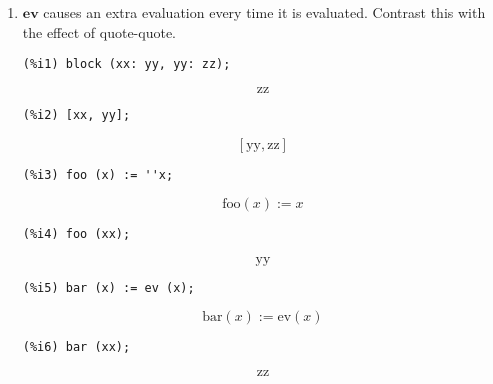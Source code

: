 \documentclass[12pt,leqno]{article}
\begin{document}
\begin{enumerate}
\item $\mathbf{ev}$ causes an extra evaluation every time it is evaluated.
Contrast this with the effect of quote-quote.
\begin{verbatim}
(%i1) block (xx: yy, yy: zz);
\end{verbatim}
\begin{equation}
\mathrm{zz}\tag{\%o1}
\label{eq:doc-group1-code18-1-1}
\end{equation}
\begin{verbatim}
(%i2) [xx, yy];
\end{verbatim}
\begin{equation}
\left[ \mathrm{yy} , \mathrm{zz} \right] \tag{\%o2}
\label{eq:doc-group1-code18-2-1}
\end{equation}
\begin{verbatim}
(%i3) foo (x) := ''x;
\end{verbatim}
\begin{equation}
\mathrm{foo}\left(x\right):=x\tag{\%o3}
\label{eq:doc-group1-code18-3-1}
\end{equation}
\begin{verbatim}
(%i4) foo (xx);
\end{verbatim}
\begin{equation}
\mathrm{yy}\tag{\%o4}
\label{eq:doc-group1-code18-4-1}
\end{equation}
\begin{verbatim}
(%i5) bar (x) := ev (x);
\end{verbatim}
\begin{equation}
\mathrm{bar}\left(x\right):=\mathrm{ev}\left(x\right)\tag{\%o5}
\label{eq:doc-group1-code18-5-1}
\end{equation}
\begin{verbatim}
(%i6) bar (xx);
\end{verbatim}
\begin{equation}
\mathrm{zz}\tag{\%o6}
\label{eq:doc-group1-code18-6-1}
\end{equation}



\end{enumerate}
\end{document}
